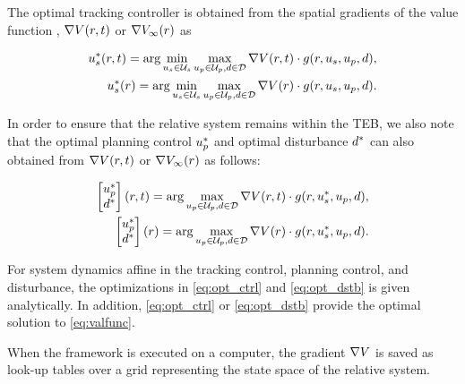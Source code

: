 The optimal tracking controller is obtained from the spatial gradients of the value function \cite{Mitchell05, Fisac15, Chen2018}, $\nabla V(r, t)$ or $\nabla V_\infty(r)$ as

\begin{subequations} \label{eq:opt_ctrl}
  \begin{align}
  \tctrl^*(\rstate, \tvar) = \arg\min_{\tctrl\in\tcset} \max_{\pctrl\in\pcset, \dstb\in\dset} \nabla\valfunc(\rstate, \tvar) \cdot \rdyn(\rstate,\tctrl,\pctrl,\dstb), \label{eq:opt_ctrl_fin}\\
  \tctrl^*(\rstate) = \arg\min_{\tctrl\in\tcset} \max_{\pctrl\in\pcset, \dstb\in\dset} \nabla\valfunc(\rstate) \cdot \rdyn(\rstate,\tctrl,\pctrl,\dstb). \label{eq:opt_ctrl_inf}
  \end{align}
\end{subequations}

In order to ensure that the relative system remains within the TEB, we also note that the optimal planning control $u_p^*$ and optimal disturbance $d^*$ can also obtained from $\nabla V(r, t)$ or $\nabla V_\infty(r)$ as follows:

\begin{subequations} \label{eq:opt_dstb}
  \begin{align}
  \begin{bmatrix}
    u_p^* \\
    d^*
  \end{bmatrix} (r, t) = \arg \max_{u_p\in\mathcal{U}_p, d\in\mathcal{D}} \nabla V(r, t) \cdot g(r,u_s^*,u_p,d), \\
  \begin{bmatrix}
    u_p^* \\
    d^*
  \end{bmatrix}(r) = \arg \max_{u_p\in\mathcal{U}_p, d\in\mathcal{D}} \nabla V(r) \cdot g(r,u_s^*,u_p,d). 
  \end{align}
\end{subequations}

For system dynamics affine in the tracking control, planning control, and disturbance, the optimizations in \eqref{eq:opt_ctrl} and \eqref{eq:opt_dstb} is given analytically.
In addition, \eqref{eq:opt_ctrl} or \eqref{eq:opt_dstb} provide the optimal solution to \eqref{eq:valfunc}.

When the framework is executed on a computer, the gradient $\nabla V$ is saved as look-up tables over a grid representing the state space of the relative system.

